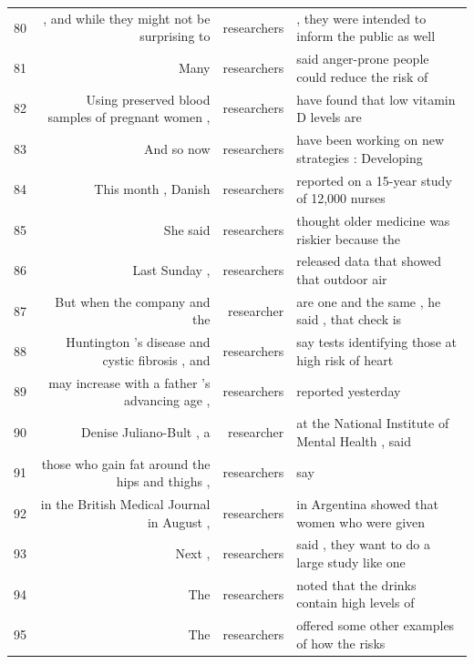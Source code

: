 {\begin{table}
\begin{tabular}{lrrl}
80 &  , and while they might not be surprising to        & researchers & , they were intended to inform the public as well  \\
81 &  Many                                               & researchers & said anger-prone people could reduce the risk of   \\
82 &  Using preserved blood samples of pregnant women ,  & researchers & have found that low vitamin D levels are           \\
83 &  And so now                                         & researchers & have been working on new strategies : Developing   \\
84 &  This month , Danish                                & researchers & reported on a 15-year study of 12,000 nurses       \\
85 &  She said                                           & researchers & thought older medicine was riskier because the     \\
86 &  Last Sunday ,                                      & researchers & released data that showed that outdoor air         \\
87 &  But when the company and the                       & researcher  & are one and the same , he said , that check is     \\
88 &  Huntington 's disease and cystic fibrosis , and    & researchers & say tests identifying those at high risk of heart  \\
89 &  may increase with a father 's advancing age ,      & researchers & reported yesterday                                 \\
90 &  Denise Juliano-Bult , a                            & researcher  & at the National Institute of Mental Health , said  \\
91 &  those who gain fat around the hips and thighs ,    & researchers & say                                                \\
92 &  in the British Medical Journal in August ,         & researchers & in Argentina showed that women who were given      \\
93 &  Next ,                                             & researchers & said , they want to do a large study like one      \\
94 &  The                                                & researchers & noted that the drinks contain high levels of       \\
95 &  The                                                & researchers & offered some other examples of how the risks       \\

\end{tabular}
\end{table}}
